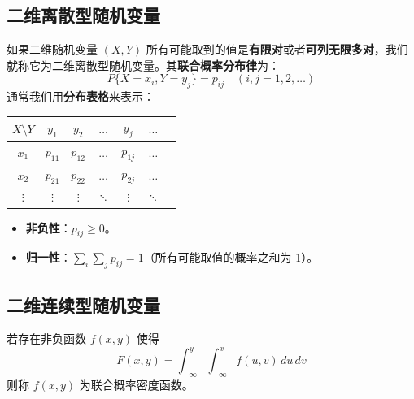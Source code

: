 \subsection{二维离散型随机变量}
\begin{definition}[二维离散型随机变量与联合分布律]
如果二维随机变量 $(X, Y)$ 所有可能取到的值是\textbf{有限对}或者\textbf{可列无限多对}，我们就称它为二维离散型随机变量。其\textbf{联合概率分布律}为：
\begin{equation}
	P\{X = x_i, Y = y_j\} = p_{ij} \quad (i, j = 1, 2, \dots)
	\label{eq:第三章:联合分布律}
\end{equation}
通常我们用\textbf{分布表格}来表示：
\begin{center}
\begin{tabular}{c|cccccc}
\toprule
$X \setminus Y$ & $y_1$ & $y_2$ & $\dots$ & $y_j$ & $\dots$ \\
\midrule
$x_1$ & $p_{11}$ & $p_{12}$ & $\dots$ & $p_{1j}$ & $\dots$ \\
$x_2$ & $p_{21}$ & $p_{22}$ & $\dots$ & $p_{2j}$ & $\dots$ \\
$\vdots$ & $\vdots$ & $\vdots$ & $\ddots$ & $\vdots$ & $\ddots$ \\
\bottomrule
\end{tabular}
\end{center}
\end{definition}

\begin{property}[联合分布律的性质]
\begin{itemize}
	\item \textbf{非负性}：$p_{ij} \ge 0$。
	\item \textbf{归一性}：$\sum_i \sum_j p_{ij} = 1$（所有可能取值的概率之和为 1）。
\end{itemize}
\end{property}

\subsection{二维连续型随机变量}
\begin{definition}[联合概率密度函数]
若存在非负函数 $f(x, y)$ 使得
\begin{equation}
	F(x, y) = \int_{-\infty}^{y} \int_{-\infty}^{x} f(u, v)\,du\,dv
	\label{eq:第三章:联合密度定义}
\end{equation}
则称 $f(x, y)$ 为联合概率密度函数。
\end{definition}

